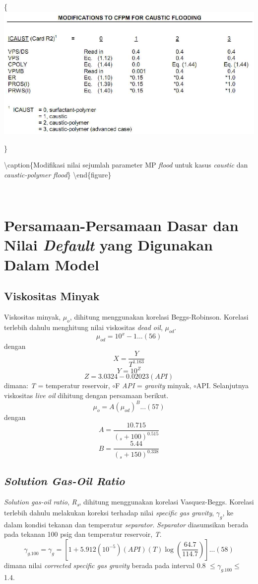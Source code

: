 \documentclass[
]{book}
\begin{document}
\{\centering \includegraphics[width=0.5\linewidth]{images/chemical/modifikasi}

\}

\textbackslash caption\{Modifikasi nilai sejumlah parameter MP \emph{flood} untuk kasus \emph{caustic} dan \emph{caustic-polymer flood}\}\label{fig:unnamed-chunk-60}
\textbackslash end\{figure\}

~

\hypertarget{persamaan-persamaan-dasar-dan-nilai-default-yang-digunakan-dalam-model}{%
\section{\texorpdfstring{Persamaan-Persamaan Dasar dan Nilai \emph{Default} yang Digunakan Dalam Model}{Persamaan-Persamaan Dasar dan Nilai Default yang Digunakan Dalam Model}}\label{persamaan-persamaan-dasar-dan-nilai-default-yang-digunakan-dalam-model}}

\hypertarget{viskositas-minyak-1}{%
\subsection{Viskositas Minyak}\label{viskositas-minyak-1}}

Viskositas minyak, \(\mu_o\), dihitung menggunakan korelasi Beggs-Robinson. Korelasi terlebih dahulu menghitung nilai viskositas \emph{dead oil}, \(\mu_{od}\).
\[\mu_{od}=10^x-1...(56)\]
dengan
\[X=\frac{Y}{T^{1.163}}\]
\[Y = 10^Z\]
\[Z= 3.0324-0.02023(API)\]
dimana:
\emph{T} = temperatur reservoir, \(\circ\)F
\emph{API} = \emph{gravity} minyak, \(\circ\)API.
Selanjutnya viskositas \emph{live oil} dihitung dengan persamaan berikut.
\[\mu_o = A (\mu_{od})^B...(57)\]
dengan
\[A=\frac{10.715}{(_s+100)^{0.515}}\]
\[B=\frac{5.44}{(_s+150)^{0.338}}\]

\hypertarget{solution-gas-oil-ratio-1}{%
\subsection{\texorpdfstring{\emph{Solution Gas-Oil Ratio}}{Solution Gas-Oil Ratio}}\label{solution-gas-oil-ratio-1}}

\emph{Solution gas-oil ratio}, \emph{R\textsubscript{s}}, dihitung menggunakan korelasi Vasquez-Beggs. Korelasi terlebih dahulu melakukan koreksi terhadap nilai \emph{specific gas gravity}, \(\gamma_g\), ke dalam kondisi tekanan dan temperatur \emph{separator}. \emph{Separator} diasumsikan berada pada tekanan 100 psig dan temperatur reservoir, \emph{T}.
\[\gamma_{g.100}=\gamma_g = \left[ 1+5.912(10^{-5})(API)(T) \log \left( \frac{64.7}{114.7} \right) \right]...(58)\]
dimana nilai \emph{corrected specific gas gravity} berada pada interval 0.8 \(\leq \gamma_{g.100} \leq\) 1.4.
\end{document}
